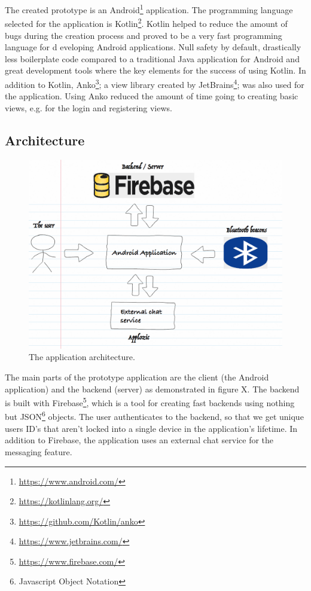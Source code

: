 The created prototype is an Android\footnote{\url{https://www.android.com/}} application. The programming language selected for the application is Kotlin\footnote{\url{https://kotlinlang.org/}}. Kotlin helped to reduce the amount of bugs during the creation process and proved to be a very fast programming language for d	eveloping Android applications. Null safety by default, drastically less boilerplate code compared to a traditional Java application for Android and great development tools where the key elements for the success of using Kotlin. In addition to Kotlin, Anko\footnote{\url{https://github.com/Kotlin/anko}}; a view library created by JetBrains\footnote{\url{https://www.jetbrains.com/}}; was also used for the application. Using Anko reduced the amount of time going to creating basic views, e.g. for the login and registering views.

\subsection{Architecture}

\begin{figure}[htb]
	\begin{center}
		\includegraphics[width=1\textwidth]{fs_architecture.png}
		\caption{The application architecture.}	
	\end{center}
\end{figure}

The main parts of the prototype application are the client (the Android application) and the backend (server) as demonstrated in figure X. The backend is built with Firebase\footnote{\url{https://www.firebase.com/}}, which is a tool for creating fast backends using nothing but JSON\footnote{Javascript Object Notation} objects. The user authenticates to the backend, so that we get unique users ID's that aren't locked into a single device in the application's lifetime. In addition to Firebase, the application uses an external chat service for the messaging feature.

